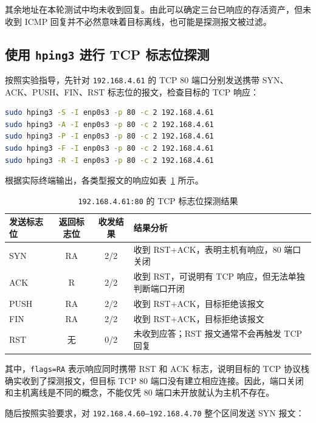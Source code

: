 其余地址在本轮测试中均未收到回复。由此可以确定三台已响应的存活资产，但未收到 ICMP 回复并不必然意味着目标离线，也可能是探测报文被过滤。

\subsection{使用 \texttt{hping3} 进行 TCP 标志位探测}

按照实验指导，先针对 \texttt{192.168.4.61} 的 TCP 80 端口分别发送携带 SYN、ACK、PUSH、FIN、RST 标志位的报文，检查目标的 TCP 响应：

\begin{lstlisting}[language=bash,caption={对单个目标进行五种 TCP 标志位探测}]
sudo hping3 -S -I enp0s3 -p 80 -c 2 192.168.4.61
sudo hping3 -A -I enp0s3 -p 80 -c 2 192.168.4.61
sudo hping3 -P -I enp0s3 -p 80 -c 2 192.168.4.61
sudo hping3 -F -I enp0s3 -p 80 -c 2 192.168.4.61
sudo hping3 -R -I enp0s3 -p 80 -c 2 192.168.4.61
\end{lstlisting}

根据实际终端输出，各类型报文的响应如表~\ref{tab:task1-tcp-flags} 所示。

\begin{table}[H]
    \centering
    \caption{\texttt{192.168.4.61:80} 的 TCP 标志位探测结果}
    \label{tab:task1-tcp-flags}
    \renewcommand{\arraystretch}{1.2}
    \begin{tabularx}{\linewidth}{l c c X}
        \toprule
        发送标志位 & 返回标志位 & 收发结果 & 结果分析 \\
        \midrule
        SYN & RA & 2/2 & 收到 RST+ACK，表明主机有响应，80 端口关闭 \\
        ACK & R & 2/2 & 收到 RST，可说明有 TCP 响应，但无法单独判断端口开闭 \\
        PUSH & RA & 2/2 & 收到 RST+ACK，目标拒绝该报文 \\
        FIN & RA & 2/2 & 收到 RST+ACK，目标拒绝该报文 \\
        RST & 无 & 0/2 & 未收到应答；RST 报文通常不会再触发 TCP 回复 \\
        \bottomrule
    \end{tabularx}
\end{table}

其中，\texttt{flags=RA} 表示响应同时携带 RST 和 ACK 标志，说明目标的 TCP 协议栈确实收到了探测报文，但目标 TCP 80 端口没有建立相应连接。因此，端口关闭和主机离线是不同的概念，不能仅凭 80 端口未开放就认为主机不存在。

随后按照实验要求，对 \texttt{192.168.4.60--192.168.4.70} 整个区间发送 SYN 报文：

